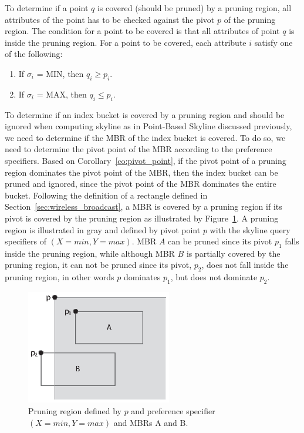 To determine if a point $q$ is covered (should be pruned) by a pruning
region, all attributes of the point has to be checked against the pivot
$p$ of the pruning region. The condition for a point to be covered is that
all attributes of point $q$ is inside the pruning region. For a point to
be covered, each attribute $i$ satisfy one of the following:
\begin{enumerate}
  \item If $\sigma_i$ = MIN, then $q_i \geq p_i$.
  \item If $\sigma_i$ = MAX, then $q_i \leq p_i$.
\end{enumerate}

To determine if an index bucket is covered by a pruning region and should be
ignored when computing skyline as in Point-Based Skyline discussed previously,
we need to determine if the MBR of the index bucket is covered. To do so, we
need to determine the pivot point of the MBR according to the preference
specifiers. Based on Corollary~\ref{co:pivot_point}, if the pivot
point of a pruning region dominates the pivot point of the MBR, then the
index bucket can be pruned and ignored, since the pivot point of the MBR
dominates the entire bucket.
Following the definition of a rectangle defined in
Section~\ref{sec:wireless_broadcast},
a MBR is covered by a pruning region if its pivot is covered by the pruning
region as illustrated by Figure~\ref{fig:pruning}. A pruning region is
illustrated in gray and
defined by pivot point $p$ with the skyline query specifiers of
$(X = min, Y = max)$. MBR $A$ can be pruned since its pivot $p_1$ falls
inside the pruning region, while although MBR $B$ is partially covered by
the pruning region, it can not be pruned since its pivot, $p_2$, does
not fall inside the pruning region, in other words $p$ dominates $p_1$, but
does not dominate $p_2$.

\begin{figure}[h]
\begin{center}
\includegraphics[width=2.5in]{Figures/pruning.eps}
\caption{\small Pruning region defined by $p$ and preference specifier
$(X = min, Y = max)$ and MBRs A and B.}
\label{fig:pruning}
\end{center}
\end{figure}

